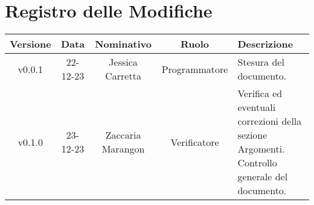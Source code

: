 \section*{\Large Registro delle Modifiche}
    \begin{table}[h]
        \centering
        \renewcommand\tabularxcolumn[1]{m{#1}} %
        \renewcommand{\arraystretch}{1.5}
        \begin{tabularx}{0.98\textwidth}
            {c|c|c|c|>{\centering\arraybackslash}X}
            \rowcolor{black}
            \textbf{\color{white} Versione} & \textbf{\color{white} Data} & \textbf{\color{white} Nominativo} & \textbf{\color{white} Ruolo} & \textbf{\color{white} Descrizione} \\ 
            \hline

            v0.0.1 & 22-12-23 & Jessica Carretta & Programmatore & Stesura del documento. \\
            v0.1.0 & 23-12-23 & Zaccaria Marangon & Verificatore & Verifica ed eventuali correzioni della sezione Argomenti. Controllo generale del documento.  \\
            \hline
        \end{tabularx}
    \end{table}
